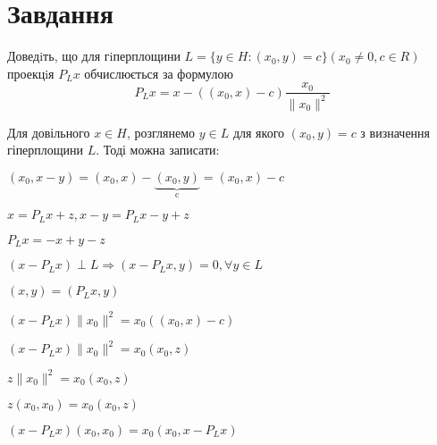 
\chapter{Завдання \theHchapter}


\begin{tcolorbox}[title=Завдання]
    
    Доведiть, що для гiперплощини 
    $ L = \{y \in H : (x_0, y) = c\} (x_0 \neq 0, c \in R)$
    проекцiя $P_Lx$ обчислюється за формулою
    $$ P_Lx = x - ((x_0, x) - c) \frac{x_0}{\| x_0 \| ^ 2} $$
    
\end{tcolorbox}




Для довільного $x \in H$, розглянемо $y \in L$
для якого $(x_0, y) = c$ з визначення гіперплощини $L$. 
Тоді можна записати:

$(x_0,x-y)= (x_0,x) - \underbrace{(x_0,y)}_{\mbox{c}} = (x_0,x)-c$


$ x = P_Lx + z, x - y = P_Lx - y + z $


$ P_Lx = -x + y - z $


$ (x - P_Lx) \perp L \Rightarrow (x - P_Lx, y) = 0, \forall y \in L $


$ (x, y) = (P_Lx, y) $






$ (x - P_Lx) \| x_0\|^2 = x_0 ((x_0, x) - c) $



$ (x - P_Lx) \| x_0\|^2 = x_0 (x_0, z) $


$ z \| x_0\|^2 = x_0 (x_0, z) $


$ z (x_0, x_0) = x_0 (x_0, z) $


$ (x - P_Lx) (x_0, x_0) = x_0 (x_0, x - P_Lx) $